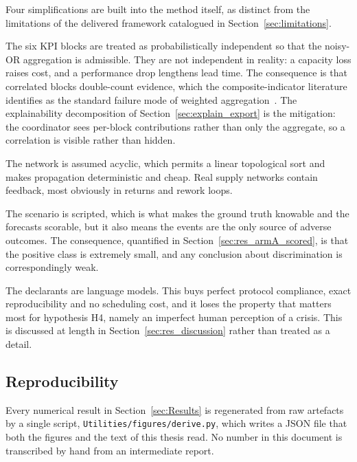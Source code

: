 Four simplifications are built into the method itself, as distinct from the limitations of
the delivered framework catalogued in Section~\ref{sec:limitations}.

The six KPI blocks are treated as probabilistically independent so that the noisy-OR
aggregation is admissible. They are not independent in reality: a capacity loss raises cost,
and a performance drop lengthens lead time. The consequence is that correlated blocks
double-count evidence, which the composite-indicator literature identifies as the standard
failure mode of weighted aggregation~\autocite{greco2018,becker2017}. The explainability
decomposition of Section~\ref{sec:explain_export} is the mitigation: the coordinator sees
per-block contributions rather than only the aggregate, so a correlation is visible rather
than hidden.

The network is assumed acyclic, which permits a linear topological sort and makes
propagation deterministic and cheap. Real supply networks contain feedback, most obviously
in returns and rework loops.

The scenario is scripted, which is what makes the ground truth knowable and the forecasts
scorable, but it also means the events are the only source of adverse outcomes. The
consequence, quantified in Section~\ref{sec:res_armA_scored}, is that the positive class is
extremely small, and any conclusion about discrimination is correspondingly weak.

The declarants are language models. This buys perfect protocol compliance, exact
reproducibility and no scheduling cost, and it loses the property that matters most for
hypothesis H4, namely an imperfect human perception of a crisis. This is discussed
at length in Section~\ref{sec:res_discussion} rather than treated as a detail.

\subsection{Reproducibility}
\label{sec:methods_repro}

Every numerical result in Section~\ref{sec:Results} is regenerated from raw artefacts by a
single script, \texttt{Utilities/figures/derive.py}, which writes a JSON file that both the
figures and the text of this thesis read. No number in this document is transcribed by hand
from an intermediate report.

